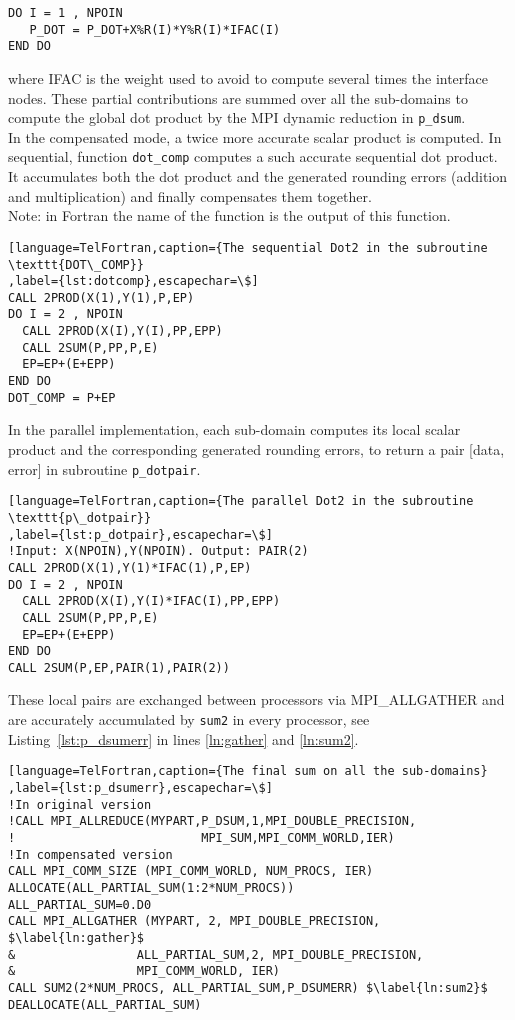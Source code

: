 \begin{lstlisting}[language=TelFortran,numbers=none,frame=none,escapechar=\$]
DO I = 1 , NPOIN
   P_DOT = P_DOT+X%R(I)*Y%R(I)*IFAC(I)
END DO
\end{lstlisting}
%
where IFAC is the weight used to avoid to compute several times the interface nodes.
These partial contributions are summed over all the sub-domains to compute
the global dot product by the MPI dynamic reduction in \texttt{p\_dsum}.\\
%
In the compensated mode, a twice more accurate scalar product is
computed.
In sequential, function \texttt{dot\_comp} computes a such
accurate sequential dot product.
It accumulates both the dot product and the generated rounding
errors (addition and multiplication) and finally compensates them together. \\
Note: in Fortran the name of the function is the
output of this function.
\begin{lstlisting}[language=TelFortran,caption={The sequential Dot2 in the subroutine \texttt{DOT\_COMP}}
,label={lst:dotcomp},escapechar=\$]
CALL 2PROD(X(1),Y(1),P,EP)
DO I = 2 , NPOIN
  CALL 2PROD(X(I),Y(I),PP,EPP)
  CALL 2SUM(P,PP,P,E)
  EP=EP+(E+EPP)
END DO
DOT_COMP = P+EP
\end{lstlisting}
%
In the parallel implementation, each sub-domain computes its
local scalar product and the corresponding generated rounding
errors, to return a pair [data, error] in subroutine \texttt{p\_dotpair}.
%
\begin{lstlisting}[language=TelFortran,caption={The parallel Dot2 in the subroutine \texttt{p\_dotpair}}
,label={lst:p_dotpair},escapechar=\$]
!Input: X(NPOIN),Y(NPOIN). Output: PAIR(2)
CALL 2PROD(X(1),Y(1)*IFAC(1),P,EP)
DO I = 2 , NPOIN
  CALL 2PROD(X(I),Y(I)*IFAC(I),PP,EPP)
  CALL 2SUM(P,PP,P,E)
  EP=EP+(E+EPP)
END DO
CALL 2SUM(P,EP,PAIR(1),PAIR(2))
\end{lstlisting}
%
These local pairs are exchanged between processors
via MPI\_ALLGATHER and are accurately accumulated by \texttt{sum2}
in every processor, see Listing~\ref{lst:p_dsumerr} in lines
\ref{ln:gather} and \ref{ln:sum2}.
%
\begin{lstlisting}[language=TelFortran,caption={The final sum on all the sub-domains}
,label={lst:p_dsumerr},escapechar=\$]
!In original version
!CALL MPI_ALLREDUCE(MYPART,P_DSUM,1,MPI_DOUBLE_PRECISION,
!                          MPI_SUM,MPI_COMM_WORLD,IER)
!In compensated version
CALL MPI_COMM_SIZE (MPI_COMM_WORLD, NUM_PROCS, IER)
ALLOCATE(ALL_PARTIAL_SUM(1:2*NUM_PROCS))
ALL_PARTIAL_SUM=0.D0
CALL MPI_ALLGATHER (MYPART, 2, MPI_DOUBLE_PRECISION, $\label{ln:gather}$
&                 ALL_PARTIAL_SUM,2, MPI_DOUBLE_PRECISION,
&                 MPI_COMM_WORLD, IER)
CALL SUM2(2*NUM_PROCS, ALL_PARTIAL_SUM,P_DSUMERR) $\label{ln:sum2}$
DEALLOCATE(ALL_PARTIAL_SUM)
\end{lstlisting}
